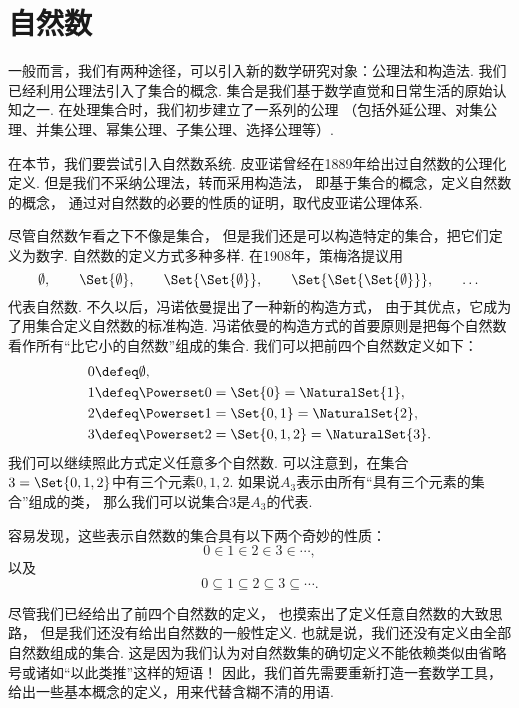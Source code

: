 \section{自然数}
一般而言，我们有两种途径，可以引入新的数学研究对象：公理法和构造法.
我们已经利用公理法引入了集合的概念.
集合是我们基于数学直觉和日常生活的原始认知之一.
在处理集合时，我们初步建立了一系列的公理%
（包括外延公理、对集公理、并集公理、幂集公理、子集公理、选择公理等）.

在本节，我们要尝试引入自然数系统.
皮亚诺曾经在1889年给出过自然数的公理化定义.
但是我们不采纳公理法，转而采用构造法，
即基于集合的概念，定义自然数的概念，
通过对自然数的必要的性质的证明，取代皮亚诺公理体系.

尽管自然数乍看之下不像是集合，
但是我们还是可以构造特定的集合，把它们定义为数字.
自然数的定义方式多种多样.
在1908年，策梅洛提议用\begin{equation*}
	\emptyset, \qquad
	\Set{\emptyset}, \qquad
	\Set{\Set{\emptyset}}, \qquad
	\Set{\Set{\Set{\emptyset}}}, \qquad
	\dotsc
\end{equation*}代表自然数.
不久以后，冯诺依曼提出了一种新的构造方式，
由于其优点，它成为了用集合定义自然数的标准构造.
冯诺依曼的构造方式的首要原则是把每个自然数看作所有“比它小的自然数”组成的集合.
我们可以把前四个自然数定义如下：\begin{align*}
	&0 \defeq \emptyset, \\
	&1 \defeq \Powerset0 = \Set{0} = \NaturalSet{1}, \\
	&2 \defeq \Powerset1 = \Set{0,1} = \NaturalSet{2}, \\
	&3 \defeq \Powerset2 = \Set{0,1,2} = \NaturalSet{3}.
\end{align*}
我们可以继续照此方式定义任意多个自然数.
可以注意到，在集合\(3=\Set{0,1,2}\)中有三个元素\(0,1,2\).
如果说\(A_3\)表示由所有“具有三个元素的集合”组成的类，
那么我们可以说集合\(3\)是\(A_3\)的代表.

容易发现，这些表示自然数的集合具有以下两个奇妙的性质：\begin{equation*}
	0 \in 1 \in 2 \in 3 \in \dotsb,
\end{equation*}
以及\begin{equation*}
	0 \subseteq 1 \subseteq 2 \subseteq 3 \subseteq \dotsb.
\end{equation*}

尽管我们已经给出了前四个自然数的定义，
也摸索出了定义任意自然数的大致思路，
但是我们还没有给出自然数的一般性定义.
也就是说，我们还没有定义由全部自然数组成的集合.
这是因为我们认为对自然数集的确切定义不能依赖类似由省略号或诸如“以此类推”这样的短语！
因此，我们首先需要重新打造一套数学工具，给出一些基本概念的定义，用来代替含糊不清的用语.

